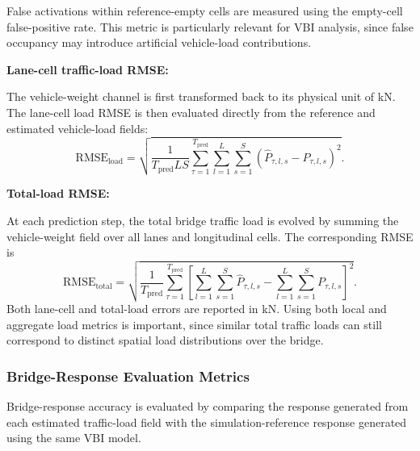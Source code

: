 \documentclass[journal]{IEEEtran}
\begin{document}
False activations within reference-empty cells are measured using the empty-cell false-positive rate. This metric is particularly relevant for VBI analysis, since false occupancy may introduce artificial vehicle-load contributions.

\textbf{Lane-cell traffic-load RMSE:}

The vehicle-weight channel is first transformed back to its physical unit of kN. The lane-cell load RMSE is then evaluated directly from the reference and estimated vehicle-load fields:
\begin{equation}
\mathrm{RMSE}_{\mathrm{load}}=\sqrt{\frac{1}{T_{\mathrm{pred}}LS}\sum_{\tau=1}^{T_{\mathrm{pred}}}\sum_{l=1}^{L}\sum_{s=1}^{S}\left(\widehat{P}_{\tau,l,s}-P_{\tau,l,s}\right)^2}.
\end{equation}

\textbf{Total-load RMSE:}

At each prediction step, the total bridge traffic load is evolved by summing the vehicle-weight field over all lanes and longitudinal cells. The corresponding RMSE is
\begin{equation}
\mathrm{RMSE}_{\mathrm{total}}=\sqrt{\frac{1}{T_{\mathrm{pred}}}\sum_{\tau=1}^{T_{\mathrm{pred}}}\left[\sum_{l=1}^{L}\sum_{s=1}^{S}\widehat{P}_{\tau,l,s}-\sum_{l=1}^{L}\sum_{s=1}^{S}P_{\tau,l,s}\right]^2}.
\end{equation}
Both lane-cell and total-load errors are reported in kN. Using both local and aggregate load metrics is important, since similar total traffic loads can still correspond to distinct spatial load distributions over the bridge.

\subsubsection{Bridge-Response Evaluation Metrics}

Bridge-response accuracy is evaluated by comparing the response generated from each estimated traffic-load field with the simulation-reference response generated using the same VBI model.
\end{document}
